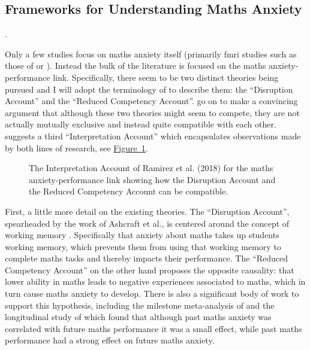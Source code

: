 \documentclass[twoside,12pt,a4paper]{report}
\newcommand{\reffig}[1]{\hyperref[fig:#1]{Figure~\ref{fig:#1}}}
\begin{document}
\subsection*{Frameworks for Understanding Maths Anxiety}.

Only a few studies focus on maths anxiety itself (primarily \gls{fmri} studies such as those of   or ). Instead the bulk of the literature is focused on the maths anxiety-performance link.  Specifically, there seem to be two distinct theories being pursued and I will adopt the terminology of  to describe them: the ``Disruption Account'' and the ``Reduced Competency Account''.  go on to make a convincing argument that although these two theories might seem to compete, they are not actually mutually exclusive and instead quite compatible with each other.  suggests a third ``Interpretation Account'' which encapsulates observations made by both lines of research, see \reffig{ramirez}.

\begin{figure}
\begin{center}

\caption{The Interpretation Account of 
Ramirez et al. (2018)
for the maths anxiety-performance link showing how the Disruption Account and the Reduced Competency Account can be compatible.
\label{fig:ramirez}
}
\end{center}
\end{figure}

First, a little more detail on the existing theories. The ``Disruption Account'', spearheaded by the work of Ashcraft et al., is centered around the concept of working memory \cite{Ashcraft2001, Ashcraft2007}. Specifically that anxiety about maths takes up students working memory, which prevents them from using that working memory to complete maths tasks and thereby impacts their performance. The ``Reduced Competency Account'' on the other hand proposes the opposite causality: that lower ability in maths leads to negative experiences associated to maths, which in turn cause maths anxiety to develop. There is also a significant body of work to support this hypothesis, including the milestone meta-analysis of  and the longitudinal study of  which found that although past maths anxiety was correlated with future maths performance it was a small effect, while past maths performance had a strong effect on future maths anxiety.
\end{document}

